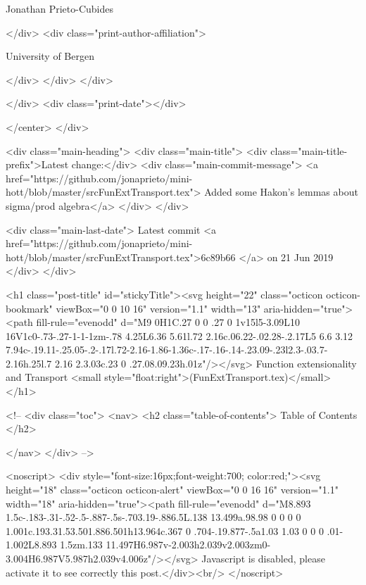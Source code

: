                   Jonathan Prieto-Cubides
                
              </div>
              <div class="print-author-affiliation">
                
                  University of Bergen
                
                </div>
            </div>
          </div>
          
          
        </div>
        <div class="print-date"></div>
        
        
    </center>
  </div>

  
  <div class="main-heading">
    <div class="main-title">
      <div class="main-title-prefix">Latest change:</div>
      <div class="main-commit-message">
            <a href="https://github.com/jonaprieto/mini-hott/blob/master/srcFunExtTransport.tex">
              Added some Hakon's lemmas about sigma/prod algebra</a>
      </div>
    </div>

    <div class="main-last-date">
      Latest commit <a href="https://github.com/jonaprieto/mini-hott/blob/master/srcFunExtTransport.tex">6c89b66 </a> on  21 Jun 2019
    </div>
  </div>
  

  <h1 class="post-title" id="stickyTitle"><svg height="22" class="octicon octicon-bookmark" viewBox="0 0 10 16" version="1.1" width="13" aria-hidden="true"><path fill-rule="evenodd" d="M9 0H1C.27 0 0 .27 0 1v15l5-3.09L10 16V1c0-.73-.27-1-1-1zm-.78 4.25L6.36 5.61l.72 2.16c.06.22-.02.28-.2.17L5 6.6 3.12 7.94c-.19.11-.25.05-.2-.17l.72-2.16-1.86-1.36c-.17-.16-.14-.23.09-.23l2.3-.03.7-2.16h.25l.7 2.16 2.3.03c.23 0 .27.08.09.23h.01z"/></svg> Function extensionality and Transport <small style="float:right">(FunExtTransport.tex)</small>
  </h1>

  <!-- 
  <div class="toc">
    <nav>
    <h2 class="table-of-contents"> Table of Contents </h2>
      

    </nav>
  </div>
   -->

  <noscript>
  <div style="font-size:16px;font-weight:700; color:red;"><svg height="18" class="octicon octicon-alert" viewBox="0 0 16 16" version="1.1" width="18" aria-hidden="true"><path fill-rule="evenodd" d="M8.893 1.5c-.183-.31-.52-.5-.887-.5s-.703.19-.886.5L.138 13.499a.98.98 0 0 0 0 1.001c.193.31.53.501.886.501h13.964c.367 0 .704-.19.877-.5a1.03 1.03 0 0 0 .01-1.002L8.893 1.5zm.133 11.497H6.987v-2.003h2.039v2.003zm0-3.004H6.987V5.987h2.039v4.006z"/></svg> Javascript is disabled, please activate it to see correctly this post.</div><br/>
  </noscript>

